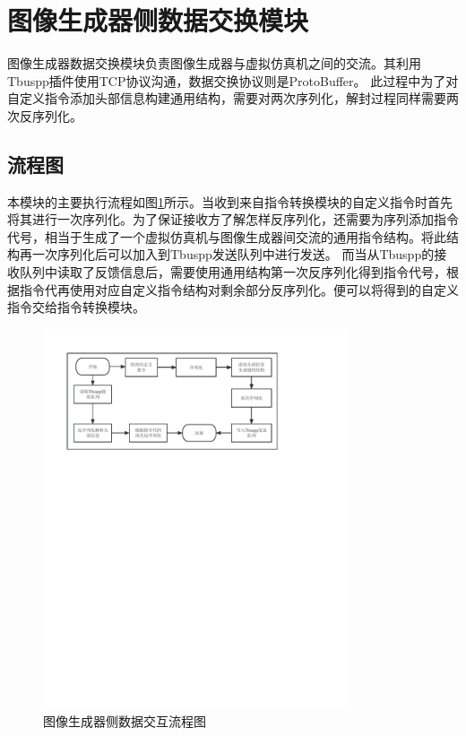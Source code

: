 \section{图像生成器侧数据交换模块}
图像生成器数据交换模块负责图像生成器与虚拟仿真机之间的交流。其利用Tbuspp插件使用TCP协议沟通，数据交换协议则是ProtoBuffer。
此过程中为了对自定义指令添加头部信息构建通用结构，需要对两次序列化，解封过程同样需要两次反序列化。
\subsection{流程图}
 本模块的主要执行流程如图\ref{module31}所示。当收到来自指令转换模块的自定义指令时首先将其进行一次序列化。为了保证接收方了解怎样反序列化，还需要为序列添加指令代号，相当于生成了一个虚拟仿真机与图像生成器间交流的通用指令结构。将此结构再一次序列化后可以加入到Tbuspp发送队列中进行发送。
 而当从Tbuspp的接收队列中读取了反馈信息后，需要使用通用结构第一次反序列化得到指令代号，根据指令代再使用对应自定义指令结构对剩余部分反序列化。便可以将得到的自定义指令交给指令转换模块。

 \begin{figure}[h!]
    \begin{center}
        \includegraphics[width=0.8\textwidth]{pictures/flowchart3.pdf}
        \caption{图像生成器侧数据交互流程图}
        \label{module31}
    \end{center}
\end{figure}
